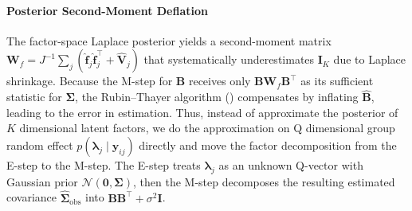 \documentclass[]{report}
\theoremstyle{definition}
\begin{document}
\paragraph{Posterior Second-Moment Deflation} The factor-space Laplace posterior yields a second-moment matrix $\mathbf{W}_{f}=J^{-1}\sum_{j}(\hat{\mathbf{f}}_{j}\hat{\mathbf{f}}_{j}^{\top}+\hat{\mathbf{V}}_{j})$ that systematically underestimates $\mathbf{I}_{K}$ due to Laplace shrinkage. Because the M-step for $\mathbf{B}$ receives only $\mathbf{BW}_{f}\mathbf{B}^{\top}$ as its sufficient statistic for $\bm{\Sigma}$, the Rubin–Thayer algorithm (\citet{Rubin1982}) compensates by inflating $\hat{\mathbf{B}}$, leading to the error in estimation. 
    Thus, instead of approximate the posterior of $K$ dimensional latent factors, we do the approximation on Q dimensional group random effect $p(\bm{\lambda}_{j}\mid \bm{y}_{ij})$ directly and move the factor decomposition from the E-step to the M-step. The E-step treats $\bm{\lambda}_{j}$ as an unknown Q-vector with Gaussian prior $\mathcal{N}(\bm{0},\bm{\Sigma})$, then the M-step decomposes the resulting estimated covariance $\hat{\bm{\Sigma}}_{\text{obs}}$ into $\mathbf{BB}^{\top}+\sigma^{2}\mathbf{I}$.
\end{document}
